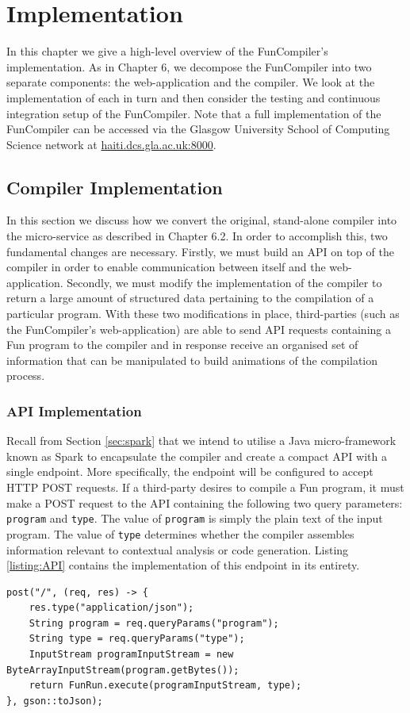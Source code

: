 \documentclass{l4proj}
\begin{document}
\chapter{Implementation}
In this chapter we give a high-level overview of the FunCompiler's implementation. As in Chapter 6, we decompose the FunCompiler into two separate components: the web-application and the compiler. We look at the implementation of each in turn and then consider the testing and continuous integration setup of the FunCompiler. Note that a full implementation of the FunCompiler can be accessed via the Glasgow University School of Computing Science network at \textcolor{blue}{\href{http://haiti.dcs.gla.ac.uk:8000}{haiti.dcs.gla.ac.uk:8000}}.

\section{Compiler Implementation}
In this section we discuss how we convert the original, stand-alone compiler into the micro-service as described in Chapter 6.2.  In order to accomplish this, two fundamental changes are necessary. Firstly, we must build an API on top of the compiler in order to enable communication between itself and the web-application. Secondly, we must modify the implementation of the compiler to return a large amount of structured data pertaining to the compilation of a particular program. With these two modifications in place, third-parties (such as the FunCompiler's web-application) are able to send API requests containing a Fun program to the compiler and in response receive an organised set of information that can be manipulated to build animations of the compilation process.

\subsection{API Implementation}
Recall from Section \ref{sec:spark} that we intend to utilise a Java micro-framework known as Spark to encapsulate the compiler and create a compact API with a single endpoint. More specifically, the endpoint will be configured to accept HTTP POST requests. If a third-party desires to compile a Fun program, it must make a POST request to the API containing the following two query parameters: \texttt{program} and \texttt{type}. The value of \texttt{program} is simply the plain text of the input program. The value of \texttt{type} determines whether the compiler assembles information relevant to contextual analysis or code generation. Listing \ref{listing:API} contains the implementation of this endpoint in its entirety.
\begin{lstlisting}[language=myjava, caption=API implementation, label=listing:API]
post("/", (req, res) -> {
	res.type("application/json");
	String program = req.queryParams("program");
 	String type = req.queryParams("type");
	InputStream programInputStream = new ByteArrayInputStream(program.getBytes());
	return FunRun.execute(programInputStream, type);
}, gson::toJson);
\end{lstlisting} 
\end{document}
